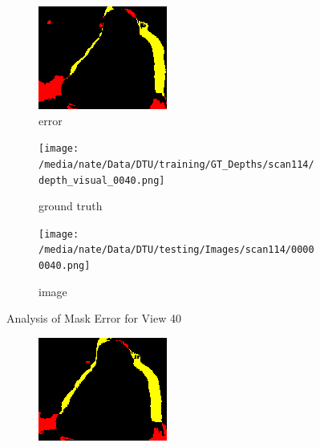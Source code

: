 \documentclass{article}
\begin{document}
\begin{figure}
\begin{subfigure}{0.3\textwidth}
		\includegraphics[width=\textwidth]{./output/040_error.png}
		\caption{error}
		\label{fig:error40}
	\end{subfigure}
	\hfill
	\centering
	\begin{subfigure}{0.3\textwidth}
		\centering
		\texttt{[image: /media/nate/Data/DTU/training/GT\_Depths/scan114/depth\_visual\_0040.png]}
		\caption{ground truth}
		\label{fig:gt40}
	\end{subfigure}
	\hfill
	\centering
	\begin{subfigure}{0.3\textwidth}
		\centering
		\texttt{[image: /media/nate/Data/DTU/testing/Images/scan114/00000040.png]}
		\caption{image}
		\label{fig:img40}
	\end{subfigure}
	\hfill
	\caption{Analysis of Mask Error for View 40}
	\label{fig:error_analys40}
\end{figure}\begin{figure}
	\centering
	\begin{subfigure}{0.3\textwidth}
		\centering
		\includegraphics[width=\textwidth]{./output/041_error.png}

\end{subfigure}
\end{figure}
\end{document}
